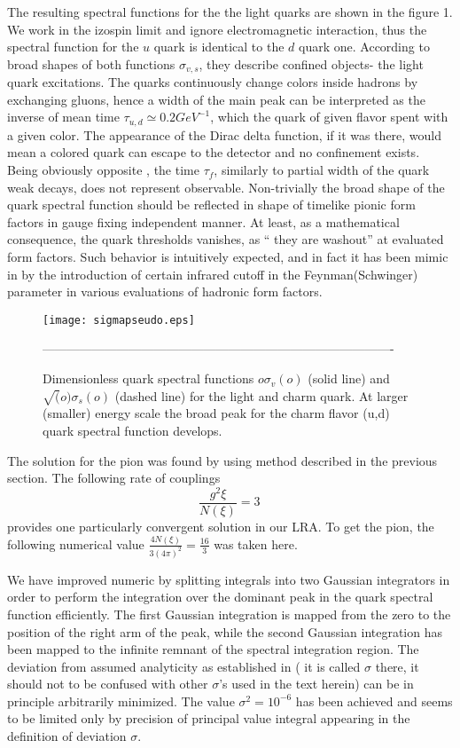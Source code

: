 \documentclass[aps,prd,superscriptaddress,eqsecnum,amsfonts,showpacs,epsfig]{revtex4}
\newcommand{\be}{\begin{equation}}
\newcommand{\ee}{\end{equation}}
\begin{document}
The resulting spectral functions for the the light quarks are shown in the figure 1. We work in the izospin limit and ignore electromagnetic interaction,
thus the spectral function  for the $u$ quark  is identical to the $d$ quark one.
According to  broad shapes of both functions $\sigma_{v,s}$, 
they describe confined objects- the light quark excitations. The quarks  continuously change colors inside hadrons by  exchanging  gluons, hence a  width of the main peak can be interpreted as  the inverse of  mean time $\tau _{u,d}\simeq 0.2 GeV^{-1}$, which the quark of given flavor spent  with a given color.
The appearance of the Dirac delta function, if it was there, would mean a colored quark can escape to the detector and no confinement exists.
Being obviously opposite , the time $\tau_f$,  similarly to partial width of the quark weak decays, does not represent observable. Non-trivially the broad shape
of the quark spectral function should be  reflected in shape of timelike pionic form factors in gauge fixing independent manner. At least,  as a mathematical consequence, the quark thresholds vanishes, as `` they are washout'' at evaluated form factors.
Such  behavior  is intuitively expected, and in fact it  has been   mimic in \cite{BFGIKL2010,GGIL2021,DDIL2022} by the introduction of certain  infrared cutoff  in the Feynman(Schwinger) parameter in  various evaluations of hadronic form factors.



 \begin{figure}
\centerline{\texttt{[image: sigmapseudo.eps]}}
\caption{Dimensionless quark spectral functions $ o\sigma_v(o)$ (solid line)  and $\sqrt(o)\sigma_s(o)$ (dashed line)
 for the light and charm quark. At larger (smaller) energy scale the broad peak for the charm flavor  (u,d)  quark spectral function develops.}
\label{dva}
{\mbox{-------------------------------------------------------------------------------------}}
\end{figure}
%

The solution for the pion was found by using method described in the previous section. 
The following rate of couplings 
%
\be \label{rate}
\frac{g^2\xi}{N(\xi)}=3 \, 
\ee
provides one particularly convergent solution in our LRA.  To get the pion, the following numerical  value $\frac{4N(\xi)}{3(4\pi)^2}=\frac{16}{3}$
was taken here.

We have  improved numeric by splitting  integrals  into two Gaussian integrators in order to 
 perform the integration over the  dominant peak in the quark spectral function
efficiently. The first Gaussian integration is mapped from the zero to the position of the right arm of the peak, while  the second Gaussian integration  has been  mapped to the infinite remnant of the spectral integration region.  
The deviation from assumed analyticity   as  established in \cite{s1,s2} ( it is called $\sigma$ there, it should not to be confused with other $\sigma$'s used in the text herein) can be in principle arbitrarily  minimized. The  value $\sigma^2=10^{-6}$ has been  achieved and seems to be  limited only by precision of principal value integral appearing in the definition of deviation  $\sigma$.
\end{document}
